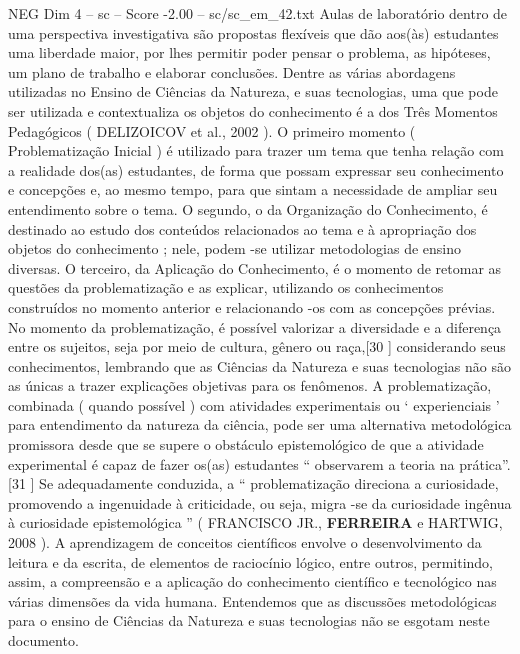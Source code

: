\begin{textsample}{NEG Dim 4 – sc – Score -2.00 – sc/sc\_em\_42.txt}
Aulas de laboratório dentro de uma perspectiva investigativa são propostas flexíveis que dão aos(às) estudantes uma liberdade maior, por lhes permitir poder pensar o problema, as hipóteses, um plano de trabalho e elaborar conclusões.
Dentre as várias abordagens utilizadas no Ensino de Ciências da Natureza, e suas tecnologias, uma que pode ser utilizada e contextualiza os objetos do conhecimento é a dos Três Momentos Pedagógicos ( DELIZOICOV et al., 2002 ).
O primeiro momento ( Problematização Inicial ) é utilizado para trazer um tema que tenha relação com a realidade dos(as) estudantes, de forma que possam expressar seu conhecimento e concepções e, ao mesmo tempo, para que sintam a necessidade de ampliar seu entendimento sobre o tema.
O segundo, o da Organização do Conhecimento, é destinado ao estudo dos conteúdos relacionados ao tema e à apropriação dos objetos do conhecimento ; nele, podem -se utilizar metodologias de ensino diversas.
O terceiro, da Aplicação do Conhecimento, é o momento de retomar as questões da problematização e as explicar, utilizando os conhecimentos construídos no momento anterior e relacionando -os com as concepções prévias.
No momento da problematização, é possível valorizar a diversidade e a diferença entre os sujeitos, seja por meio de cultura, gênero ou raça,[30 ] considerando seus conhecimentos, lembrando que as Ciências da Natureza e suas tecnologias não são as únicas a trazer explicações objetivas para os fenômenos.
A problematização, combinada ( quando possível ) com atividades experimentais ou ‘ experienciais ’ para entendimento da natureza da ciência, pode ser uma alternativa metodológica promissora desde que se supere o obstáculo epistemológico de que a atividade experimental é capaz de fazer os(as) estudantes “ observarem a teoria na prática”.[31 ] Se adequadamente conduzida, a “ problematização direciona a curiosidade, promovendo a ingenuidade à criticidade, ou seja, migra -se da curiosidade ingênua à curiosidade epistemológica ” ( FRANCISCO JR., \textbf{FERREIRA} e HARTWIG, 2008 ).
A aprendizagem de conceitos científicos envolve o desenvolvimento da leitura e da escrita, de elementos de raciocínio lógico, entre outros, permitindo, assim, a compreensão e a aplicação do conhecimento científico e tecnológico nas várias dimensões da vida humana.
Entendemos que as discussões metodológicas para o ensino de Ciências da Natureza e suas tecnologias não se esgotam neste documento.

\end{textsample}
